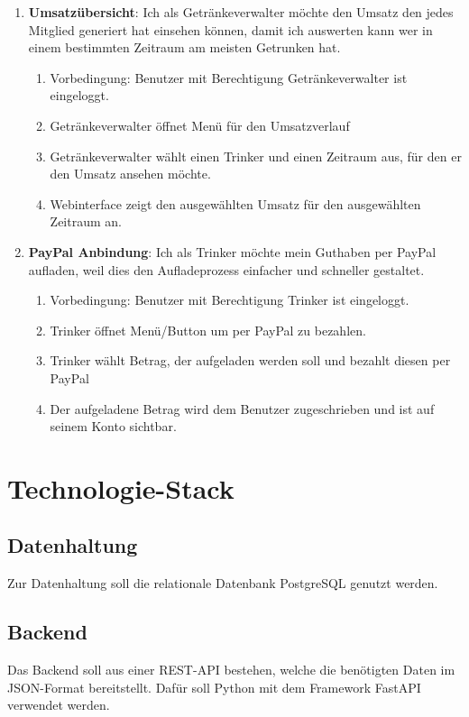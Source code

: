 \documentclass[conference,a4paper]{cs-techrep}
\begin{document}
\begin{enumerate}[{USC}1]

\item \textbf{Umsatzübersicht}: Ich als Getränkeverwalter möchte den Umsatz den jedes Mitglied generiert hat einsehen können, damit ich auswerten kann wer in einem bestimmten Zeitraum am meisten Getrunken hat.
\begin{enumerate}
	\item Vorbedingung: Benutzer mit Berechtigung Getränkeverwalter ist eingeloggt.
	\item Getränkeverwalter öffnet Menü für den Umsatzverlauf
	\item Getränkeverwalter wählt einen Trinker und einen Zeitraum aus, für den er den Umsatz ansehen möchte.
	\item Webinterface zeigt den ausgewählten Umsatz für den ausgewählten Zeitraum an.
\end{enumerate}

\item \textbf{PayPal Anbindung}: Ich als Trinker möchte mein Guthaben per PayPal aufladen, weil dies den Aufladeprozess einfacher und schneller gestaltet.
\begin{enumerate}
	\item Vorbedingung: Benutzer mit Berechtigung Trinker ist eingeloggt.
	\item Trinker öffnet Menü/Button um per PayPal zu bezahlen.
	\item Trinker wählt Betrag, der aufgeladen werden soll und bezahlt diesen per PayPal
	\item Der aufgeladene Betrag wird dem Benutzer zugeschrieben und ist auf seinem Konto sichtbar.
\end{enumerate}

\end{enumerate}

\section{Technologie-Stack}
\subsection{Datenhaltung}
Zur Datenhaltung soll die relationale Datenbank PostgreSQL genutzt werden.
\subsection{Backend}
Das Backend soll aus einer REST-API bestehen, welche die benötigten Daten im JSON-Format bereitstellt. Dafür soll Python mit dem Framework FastAPI verwendet werden.
\end{document}
